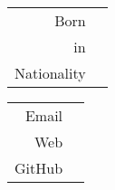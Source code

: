 \begin{minipage}[t]{0.35\linewidth}
	{\Huge\name}
\end{minipage}%
\hfill
\begin{minipage}[t]{0.3\linewidth}
	\footnotesize
	\begin{tabular}{rl}
		{\color{lightgray}Born} 	& \born \\
		{\color{lightgray}in}		& \bornin \\
		{\color{lightgray}Nationality}	& \citizenship 
	\end{tabular}
\end{minipage}%
\hfill
\begin{minipage}[t]{0.3\linewidth}
	\footnotesize
	\begin{tabular}{rl}
		{\color{lightgray}Email} 	& \email \\
		{\color{lightgray}Web}		& \mywebpage \\
		{\color{lightgray}GitHub}	& \mygithub 
	\end{tabular}
\end{minipage}
